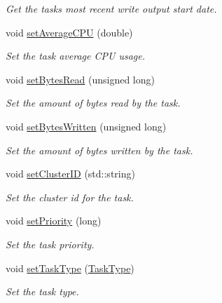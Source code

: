 \begin{DoxyCompactItemize}
\begin{DoxyCompactList}\small\item\em Get the task\textquotesingle{}s most recent write output start date. \end{DoxyCompactList}\item 
void \hyperlink{classwrench_1_1_workflow_task_a8f4207c4fc2eea8f6370701a747a5238}{set\+Average\+C\+PU} (double)
\begin{DoxyCompactList}\small\item\em Set the task average C\+PU usage. \end{DoxyCompactList}\item 
void \hyperlink{classwrench_1_1_workflow_task_ab438ab4409f1ddcb423c90577a611fe6}{set\+Bytes\+Read} (unsigned long)
\begin{DoxyCompactList}\small\item\em Set the amount of bytes read by the task. \end{DoxyCompactList}\item 
void \hyperlink{classwrench_1_1_workflow_task_a8291e3248b7246eab498fc0378199b76}{set\+Bytes\+Written} (unsigned long)
\begin{DoxyCompactList}\small\item\em Set the amount of bytes written by the task. \end{DoxyCompactList}\item 
void \hyperlink{classwrench_1_1_workflow_task_ab8d621c9cf50b489fd6b092bea59872a}{set\+Cluster\+ID} (std\+::string)
\begin{DoxyCompactList}\small\item\em Set the cluster id for the task. \end{DoxyCompactList}\item 
void \hyperlink{classwrench_1_1_workflow_task_ae5101ae5e4e386705a549e4e91432049}{set\+Priority} (long)
\begin{DoxyCompactList}\small\item\em Set the task priority. \end{DoxyCompactList}\item 
void \hyperlink{classwrench_1_1_workflow_task_ab10c4b26c9f669dd39c9bf76b597abf9}{set\+Task\+Type} (\hyperlink{classwrench_1_1_workflow_task_a490a935259b9425a3e4fb011a86cb4bf}{Task\+Type})
\begin{DoxyCompactList}\small\item\em Set the task type. \end{DoxyCompactList}\end{DoxyCompactItemize}
